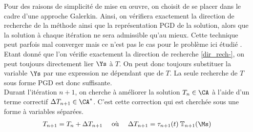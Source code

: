  Pour des raisons de simplicité de mise en \oe{}uvre, on choisit de se placer dans le cadre d'une approche Galerkin. Ainsi, on vérifiera exactement la direction de recherche de la méthode ainsi que la représentation PGD de la solution, alors que la solution à chaque itération ne sera admissible qu'au mieux. Cette technique peut parfois mal converger mais ce n'est pas le cas pour le problème ici étudié \cite{Lad10}.\\ 
Etant donné que l'on vérifie exactement la direction de recherche \eqref{dir_rech-}, on peut toujours directement lier $\Ys$ à $T$. On peut donc toujours substituer la variable $\Ys$ par une expression ne dépendant que de $T$. La seule recherche de $T$ sous forme PGD est donc suffisante.\\
Durant l'itération $n+1$, on cherche à améliorer la solution $T_n \in \CA$ à l'aide d'un terme correctif $\Delta T_{n+1} \in \CA^*$. C'est cette correction qui est cherchée sous une forme à variables séparées. 
\begin{equation}
\begin{aligned}
T_{n+1}= T_n + \Delta T_{n+1} \quad \textrm{ où } \quad \Delta T_{n+1} = \tau_{n+1}(t) \: \mathbb{T}_{n+1} (\Ms)
\end{aligned}
\end{equation}
 

  